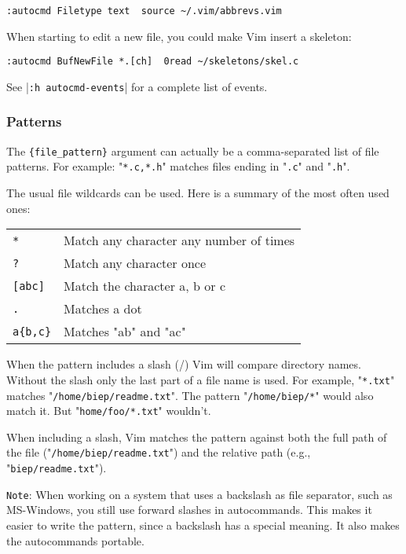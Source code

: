 \begin{Verbatim}[samepage=true]
 :autocmd Filetype text  source ~/.vim/abbrevs.vim
\end{Verbatim}

When starting to edit a new file, you could make Vim insert a skeleton:

\begin{Verbatim}[samepage=true]
 :autocmd BufNewFile *.[ch]  0read ~/skeletons/skel.c
\end{Verbatim}

See |\texttt{:h autocmd-events}| for a complete list of events.

\subsubsection{Patterns}
The \texttt{\{file\_pattern\}} argument can actually be a comma-separated list of file patterns.
For example: "\texttt{*.c,*.h}" matches files ending in "\texttt{.c}" and "\texttt{.h}".

The usual file wildcards can be used.
Here is a summary of the most often used ones:

\begin{center} \begin{tabular}{l l}
				\texttt{*} & Match any character any number of times \\
				\texttt{?} & Match any character once \\
				\texttt{[abc]} & Match the character a, b or c \\
				\texttt{.} & Matches a dot \\
				\texttt{a\{b,c\}} & Matches "ab" and "ac" \\
\end{tabular} \end{center}

When the pattern includes a slash (/) Vim will compare directory names.
Without the slash only the last part of a file name is used.
For example, "\texttt{*.txt}" matches "\texttt{/home/biep/readme.txt}".
The pattern "\texttt{/home/biep/*}" would also match it.
But "\texttt{home/foo/*.txt}" wouldn't.

When including a slash, Vim matches the pattern against both the full path of the file ("\texttt{/home/biep/readme.txt}") and the relative path (e.g., "\texttt{biep/readme.txt}").

\texttt{Note}: When working on a system that uses a backslash as file separator, such as MS-Windows, you still use forward slashes in autocommands.
This makes it easier to write the pattern, since a backslash has a special meaning.
It also makes the autocommands portable.

